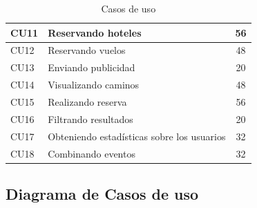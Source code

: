 \begin{table}[H]
\begin{tabular}{|l|l|c|}
CU11                                                          & Reservando hoteles                                                & 56                    \\ \hline
CU12                                                          & Reservando vuelos                                                 & 48                    \\ \hline
CU13                                                          & Enviando publicidad                                               & 20                    \\ \hline
CU14                                                          & Visualizando caminos                                              & 48                    \\ \hline
CU15                                                          & Realizando reserva                                                & 56                    \\ \hline
CU16                                                          & Filtrando resultados                                              & 20                    \\ \hline
CU17                                                          & Obteniendo estadísticas sobre los usuarios                        & 32                    \\ \hline
CU18                                                          & Combinando eventos                                                & 32                    \\ \hline
\end{tabular}
\caption{Casos de uso}
\label{tab:cu}
\end{table}

\subsection{Diagrama de Casos de uso}

